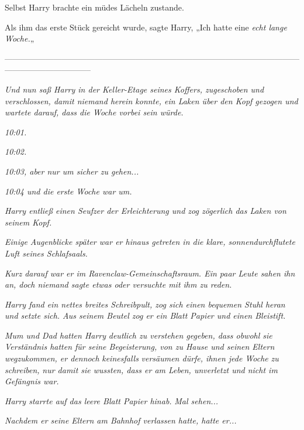 {Selbst Harry brachte ein müdes Lächeln zustande.

Als ihm das erste Stück gereicht wurde, sagte Harry, „Ich hatte eine \emph{echt lange Woche.}„

--------------------------------------------------------------------------------------------------------------------------------------------

\hfill\break \emph{Und nun saß Harry in der Keller-Etage seines Koffers, zugeschoben und verschlossen, damit niemand herein konnte, ein Laken über den Kopf gezogen und wartete darauf, dass die Woche vorbei sein würde.}

\emph{10:01.}

\emph{10:02.}

\emph{10:03, aber nur um sicher zu gehen...}

\emph{10:04 und die erste Woche war um.}

\emph{Harry entließ einen Seufzer der Erleichterung und zog zögerlich das Laken von seinem Kopf.}

\emph{Einige Augenblicke später war er hinaus getreten in die klare, sonnendurchflutete Luft seines Schlafsaals.}

\emph{Kurz darauf war er im Ravenclaw-Gemeinschaftsraum. Ein paar Leute sahen ihn an, doch niemand sagte etwas oder versuchte mit ihm zu reden.}

\emph{Harry fand ein nettes breites Schreibpult, zog sich einen bequemen Stuhl heran und setzte sich. Aus seinem Beutel zog er ein Blatt Papier und einen Bleistift.}

\emph{Mum und Dad hatten Harry} \emph{deutlich zu verstehen gegeben, dass obwohl sie Verständnis hatten für seine Begeisterung, von zu Hause und seinen Eltern wegzukommen, er dennoch} \emph{\emph{keinesfalls}} \emph{\emph{versäumen dürfe, ihnen jede Woche}} \emph{zu schreiben,} \emph{nur damit sie wussten, dass er am Leben, unverletzt und nicht im Gefängnis war.}

\emph{Harry starrte auf das leere Blatt Papier hinab.} \emph{\emph{Mal sehen...}}

\emph{Nachdem er seine Eltern am Bahnhof verlassen hatte, hatte er...}

}
